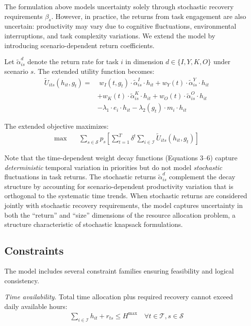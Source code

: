 \documentclass[preprint,review,11pt]{elsarticle}
\begin{document}
The formulation above models uncertainty solely through stochastic recovery requirements $\beta_s$. However, in practice, the returns from task engagement are also uncertain: productivity may vary due to cognitive fluctuations, environmental interruptions, and task complexity variations. We extend the model by introducing scenario-dependent return coefficients.

Let $\tilde{\alpha}_{is}^d$ denote the return rate for task $i$ in dimension $d \in \{I, Y, K, O\}$ under scenario $s$. The extended utility function becomes:
\begin{align}
\tilde{U}_{its}(h_{it}, g_t) = &\; w_I(t, g_t) \cdot \tilde{\alpha}_{is}^I \cdot h_{it} + w_Y(t) \cdot \tilde{\alpha}_{is}^Y \cdot h_{it} \nonumber \\
&+ w_K(t) \cdot \tilde{\alpha}_{is}^K \cdot h_{it} + w_O(t) \cdot \tilde{\alpha}_{is}^O \cdot h_{it} \nonumber \\
&- \lambda_1 \cdot e_i \cdot h_{it} - \lambda_2(g_t) \cdot m_i \cdot h_{it}
\end{align}

The extended objective maximizes:
\begin{align}
\max \quad & \sum_{s \in \mathcal{S}} p_s \left[ \sum_{t=1}^T \delta^t \sum_{i \in \mathcal{I}} \tilde{U}_{its}(h_{it}, g_t) \right]
\end{align}

Note that the time-dependent weight decay functions (Equations 3--6) capture \textit{deterministic} temporal variation in priorities but do not model \textit{stochastic} fluctuations in task returns. The stochastic returns $\tilde{\alpha}_{is}^d$ complement the decay structure by accounting for scenario-dependent productivity variation that is orthogonal to the systematic time trends. When stochastic returns are considered jointly with stochastic recovery requirements, the model captures uncertainty in both the ``return'' and ``size'' dimensions of the resource allocation problem, a structure characteristic of stochastic knapsack formulations.

\subsection{Constraints}

The model includes several constraint families ensuring feasibility and logical consistency.

\textit{Time availability.} Total time allocation plus required recovery cannot exceed daily available hours:
\begin{align}
\sum_{i \in \mathcal{I}} h_{it} + r_{ts} \leq H^{\max} \quad \forall t \in \mathcal{T}, s \in \mathcal{S}
\end{align}
\end{document}
